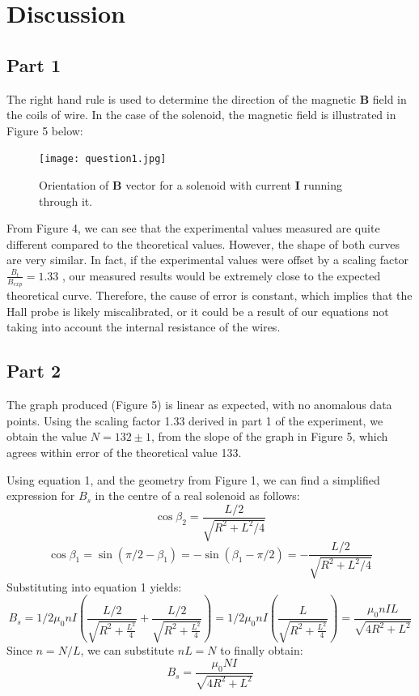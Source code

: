 \documentclass[letterpaper]{article}
\begin{document}
\section{Discussion}

\subsection{Part 1}

The right hand rule is used to determine the
direction of the magnetic $\textbf{B}$ field in the coils of wire. In the case of the
solenoid, the magnetic field is illustrated in Figure 5 below:

\begin{figure}[H]
 \centering
 \texttt{[image: question1.jpg]}
 \caption{Orientation of \textbf{B} vector for a solenoid with current \textbf{I} running through it.}
\end{figure}

From Figure 4, we can see that the experimental values measured are quite different
compared to the theoretical values. However, the shape of both curves are very similar.
In fact, if the experimental values were offset by a scaling factor $\frac{B_t}{B_{exp}}=1.33$ , our
measured results would be extremely close to the expected theoretical curve. Therefore,
the cause of error is constant, which implies that the Hall probe is likely miscalibrated,
or it could be a result of our equations not taking into account the internal resistance of the wires.



\subsection{Part 2}


The graph produced (Figure 5) is linear as expected, with no anomalous data points.
Using the scaling factor 1.33 derived in part 1 of the experiment, we obtain the value $N=132 \pm 1$,
from the slope of the graph in Figure 5, which agrees within error of the theoretical value 133.



Using equation 1, and the geometry from Figure 1, we can find a simplified expression for $B_s$ in the centre of a real solenoid as follows:
$$ \cos{\beta_2} = \frac{L/2}{\sqrt{R^2+L^2/4}}$$
$$ \cos{\beta_1} = \sin{(\pi/2 - \beta_1)} = -\sin{(\beta_1-\pi/2)} = -\frac{L/2}{\sqrt{R^2+L^2/4}}  $$
Substituting into equation 1 yields:
$$ B_s = 1/2 \mu_0nI \left(\frac{L/2}{\sqrt{R^2+\frac{L^2}{4}}} + \frac{L/2}{\sqrt{R^2+\frac{L^2}{4}}} \right) =  1/2\mu_0nI \left(\frac{L}{\sqrt{R^2+\frac{L^2}{4}}} \right)= \frac{\mu_0nIL}{\sqrt{4R^2+L^2}}$$
Since $n=N/L$, we can substitute $nL=N$ to finally obtain:
$$ B_s= \frac{\mu_0NI}{\sqrt{4R^2+L^2}} $$
\end{document}
